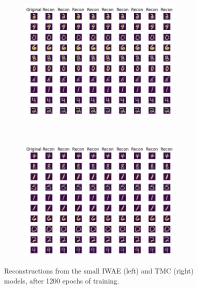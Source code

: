 \documentclass{article}
\begin{document}
\begin{appendices}
\begin{figure}[th!]
    \centering
    \begin{subfigure}[t]{0.5\textwidth}
    \hspace*{-2cm}
        \centering
        \includegraphics[height=6cm]{Figures/IWAE_recon_small.png}
    \end{subfigure}%
    ~ 
    \begin{subfigure}[t]{0.5\textwidth}
        \centering
        \includegraphics[height=6cm]{Figures/TMC_recon_small.png}
    \end{subfigure}
    \caption{Reconstructions from the small IWAE (left) and TMC (right) models, after 1200 epochs of training.}
    \label{fig:reconstructions}
\end{figure}


\end{appendices}
\end{document}
